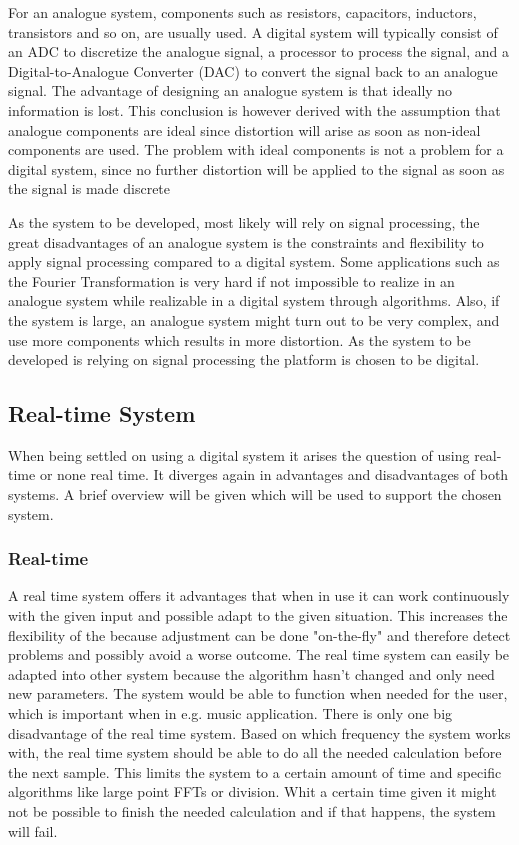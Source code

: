 For an analogue system, components such as resistors, capacitors, inductors, transistors and so on, are usually used. A digital system will typically consist of an ADC to discretize the analogue signal, a processor to process the signal, and a Digital-to-Analogue Converter (DAC) to convert the signal back to an analogue signal. The advantage of designing an analogue system is that ideally no information is lost. This conclusion is however derived with the assumption that analogue components are ideal since distortion will arise as soon as non-ideal components are used. The problem with ideal components is not a problem for a digital system, since no further distortion will be applied to the signal as soon as the signal is made discrete

As the system to be developed, most likely will rely on signal processing, the great disadvantages of an analogue system is the constraints and flexibility to apply signal processing compared to a digital system. Some applications such as the Fourier Transformation is very hard if not impossible to realize in an analogue system while realizable in a digital system through algorithms. Also, if the system is large, an analogue system might turn out to be very complex, and use more components which results in more distortion. As the system to be developed is relying on signal processing the platform is chosen to be digital.

\subsection{Real-time System}

When being settled on using a digital system it arises the question of using real-time or none real time. It diverges again in advantages and disadvantages of both systems. A brief overview will be given which will be used to support the chosen system.

\subsubsection*{Real-time}
A real time system offers it advantages that when in use it can work continuously with the given input and possible adapt to the given situation. This increases the flexibility of the because adjustment can be done "on-the-fly" and therefore detect problems and possibly avoid a worse outcome. The real time system can easily be adapted into other system because the algorithm hasn't changed and only need new parameters. The system would be able to function when needed for the user, which is important when in e.g. music application. There is only one big disadvantage of the real time system. Based on which frequency the system works with, the real time system should be able to do all the needed calculation before the next sample. This limits the system to a certain amount of time and specific algorithms like large point FFTs or division. Whit a certain time given it might not be possible to finish the needed calculation and if that happens, the system will fail.

